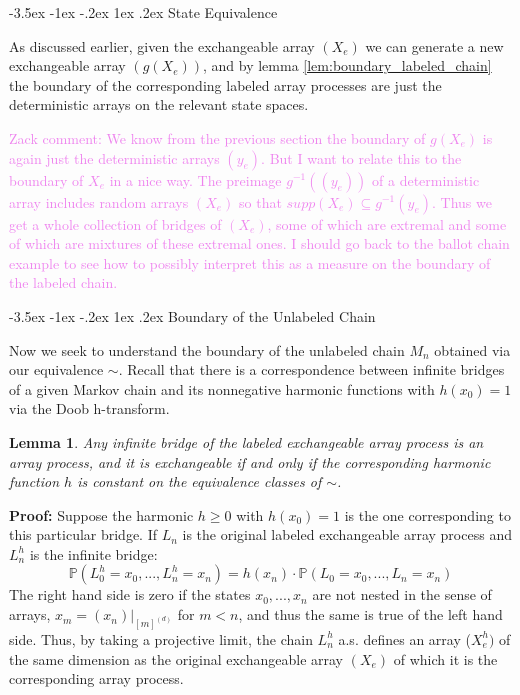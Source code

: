 \documentclass[11pt,oneside,reqno]{article}
\makeatletter
\theoremstyle{plain}
\newtheorem{lemma}[theorem]{Lemma}
\theoremstyle{definition}
\numberwithin{equation}{section}
\def\subsection#1{\@startsection {subsection}{2}{0pt}%
{-3.5ex \@plus -1ex \@minus -.2ex}%
{1ex \@plus.2ex}%
{\bf\mathversion{bold}}{#1}}
\renewcommand{\geq}{\geqslant}
\renewcommand{\P}{\mathbb{P}}
\newcommand{\zack}[1]{\textcolor{Violet}{Zack comment: #1}}
\makeatother
\begin{document}
\subsection{State Equivalence}

\noindent As discussed earlier, given the exchangeable array $(X_e)$ we can generate a new exchangeable array $(g(X_e))$, and by lemma \ref{lem:boundary_labeled_chain} the boundary of the corresponding labeled array processes are just the deterministic arrays on the relevant state spaces.

\zack{We know from the previous section the boundary of $g(X_e)$ is again just the deterministic arrays $(y_e)$. But I want to relate this to the boundary of $X_e$ in a nice way. The preimage $g^{-1}((y_e))$ of a deterministic array includes random arrays $(X_e)$ so that $supp(X_e) \subseteq g^{-1}(y_e)$. Thus we get a whole collection of bridges of $(X_e)$, some of which are extremal and some of which are mixtures of these extremal ones. I should go back to the ballot chain example to see how to possibly interpret this as a measure on the boundary of the labeled chain. }





\subsection{Boundary of the Unlabeled Chain}

\noindent Now we seek to understand the boundary of the unlabeled chain $M_n$ obtained via our equivalence $\sim$. Recall that there is a correspondence between infinite bridges of a given Markov chain and its nonnegative harmonic functions with $h(x_0) = 1$ via the Doob h-transform. 

\begin{lemma}
    Any infinite bridge of the labeled exchangeable array process is an array process, and it is exchangeable if and only if the corresponding harmonic function $h$ is constant on the equivalence classes of $\sim$. 

    \label{lem:harmonic_functions_labeled}
\end{lemma}

\noindent \textbf{Proof: } Suppose the harmonic $h \geq 0$ with $h(x_0) = 1$ is the one corresponding to this particular bridge. If $L_n$ is the original labeled exchangeable array process and $L^h_n$ is the infinite bridge:
%
\[\P(L^h_0 = x_0, ..., L^h_n = x_n) = h(x_n) \cdot \P(L_0 = x_0, ..., L_n = x_n)\]
%
\noindent The right hand side is zero if the states $x_0, ... , x_n$ are not nested in the sense of arrays, $x_m = (x_n) |_{[m]^{(d)}}$ for $m < n$, and thus the same is true of the left hand side. Thus, by taking a projective limit, the chain $L_n^h$ a.s. defines an array ($X^h_e)$ of the same dimension as the original exchangeable array $(X_e)$ of which it is the corresponding array process. 
\end{document}
